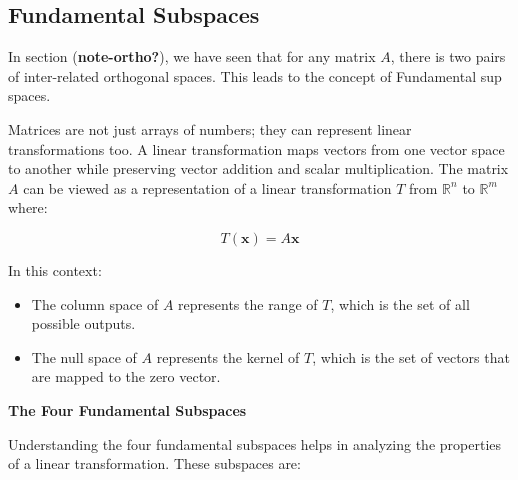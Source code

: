\documentclass[
  letterpaper,
  DIV=11,
  numbers=noendperiod]{scrreprt}
\providecommand{\tightlist}{%
  \setlength{\itemsep}{0pt}\setlength{\parskip}{0pt}}\usepackage{longtable,booktabs,array}
\theoremstyle{plain}
\theoremstyle{definition}
\theoremstyle{remark}
\begin{document}
\subsection*{Fundamental Subspaces}\label{fundamental-subspaces}

In section (\textbf{note-ortho?}), we have seen that for any matrix
\(A\), there is two pairs of inter-related orthogonal spaces. This leads
to the concept of Fundamental sup spaces.

Matrices are not just arrays of numbers; they can represent linear
transformations too. A linear transformation maps vectors from one
vector space to another while preserving vector addition and scalar
multiplication. The matrix \(A\) can be viewed as a representation of a
linear transformation \(T\) from \(\mathbb{R}^n\) to \(\mathbb{R}^m\)
where:

\[T(\mathbf{x}) = A \mathbf{x}\]

In this context:

\begin{itemize}
\tightlist
\item
  The column space of \(A\) represents the range of \(T\), which is the
  set of all possible outputs.
\item
  The null space of \(A\) represents the kernel of \(T\), which is the
  set of vectors that are mapped to the zero vector.
\end{itemize}

\textbf{The Four Fundamental Subspaces}

Understanding the four fundamental subspaces helps in analyzing the
properties of a linear transformation. These subspaces are:
\end{document}
